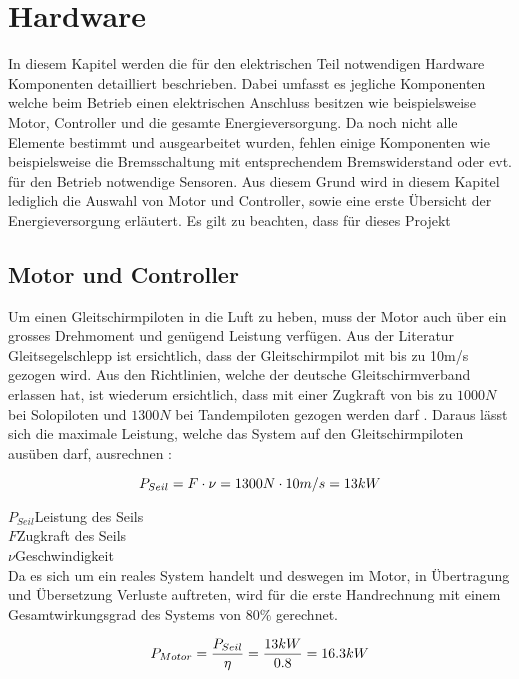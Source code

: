 \section{Hardware}\label{sec:Hardware}
In diesem Kapitel werden die für den elektrischen Teil notwendigen Hardware Komponenten detailliert beschrieben. Dabei umfasst es jegliche Komponenten welche beim Betrieb einen elektrischen Anschluss besitzen wie beispielsweise Motor, Controller und die gesamte Energieversorgung. Da noch nicht alle Elemente bestimmt und ausgearbeitet wurden, fehlen einige Komponenten wie beispielsweise die Bremsschaltung mit entsprechendem Bremswiderstand oder evt. für den Betrieb notwendige Sensoren. Aus diesem Grund wird in diesem Kapitel lediglich die Auswahl von Motor und Controller, sowie eine erste Übersicht der Energieversorgung erläutert. Es gilt zu beachten, dass für dieses Projekt 

\subsection{Motor und Controller}\label{subsec:MotorController}
Um einen Gleitschirmpiloten in die Luft zu heben, muss der Motor auch über ein grosses Drehmoment und genügend Leistung verfügen. Aus der Literatur Gleitsegelschlepp \cite{Gleitsegelschlepp} ist ersichtlich, dass der Gleitschirmpilot mit bis zu 10m/s gezogen wird. Aus den Richtlinien, welche der deutsche Gleitschirmverband erlassen hat, ist wiederum ersichtlich, dass mit einer Zugkraft von bis zu $ 1000N $ bei Solopiloten und $ 1300N $ bei Tandempiloten gezogen werden darf \cite{WindenProtokoll}. Daraus lässt sich die maximale Leistung, welche das System auf den Gleitschirmpiloten ausüben darf, ausrechnen \cite{Kuchling}:


\begin{equation}
\centering
	P_{Seil}=F \cdot \nu=1300N \cdot 10m/s=13kW
\label{eq:LeistungSeil}
\end{equation}

$ P_{Seil} $\quad 	Leistung des Seils     \\
$ F $\qquad  Zugkraft des Seils    \\
$ \nu $\qquad  Geschwindigkeit     \\

Da es sich um ein reales System handelt und deswegen im Motor, in Übertragung und Übersetzung Verluste auftreten, wird für die erste Handrechnung mit einem Gesamtwirkungsgrad des Systems von $80\%$ gerechnet.

\begin{equation}
\centering
	P_{Motor}=\frac{P_{Seil}}{\eta}=\frac{13kW}{0.8}=16.3kW
\label{eq:LeistungMotor}
\end{equation}

